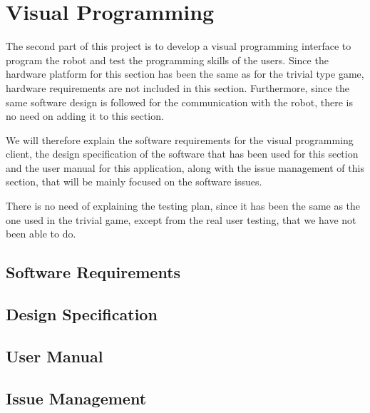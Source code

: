 \clearpage
\section{Visual Programming}

The second part of this project is to develop a visual programming interface to program the robot
and test the programming skills of the users. Since the hardware platform for this section has been
the same as for the trivial type game, hardware requirements are not included in this section.
Furthermore, since the same software design is followed for the communication with the robot, there
is no need on adding it to this section.

We will therefore explain the software requirements for the visual programming client, the design
specification of the software that has been used for this section and the user manual for this
application, along with the issue management of this section, that will be mainly focused on the
software issues.

There is no need of explaining the testing plan, since it has been the same as the one used in the
trivial game, except from the real user testing, that we have not been able to do.

\subsection{Software Requirements}

\subsection{Design Specification}

\subsection{User Manual}

\subsection{Issue Management}
